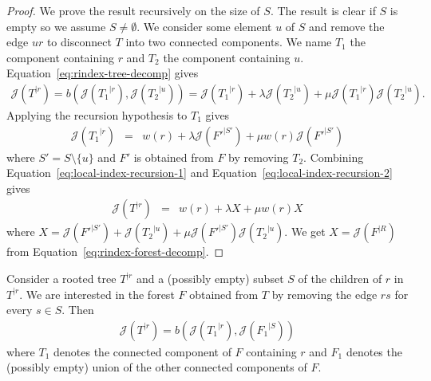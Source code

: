 \documentclass[11 pt]{modarticle}
\newcommand{\wmap}{w}
\newcommand{\rtree}[2]{{#1}^{\lvert #2}}
\newcommand{\bilinear}{b}
\newcommand{\rindexsymbol}{\mathcal{J}}
\newcommand{\rindex}[2]{\rindexsymbol(\rtree{#2}{#1})}
\begin{document}
\begin{proof}
We prove the result recursively on the size of $S$. The result is clear if $S$ is empty so we assume $S \neq \emptyset$. We consider some element $u$ of $S$ and remove the edge $ur$ to disconnect $T$ into two connected components. We name $T_1$ the component containing $r$ and $T_2$ the component containing $u$. Equation~\eqref{eq:rindex-tree-decomp} gives
\begin{eqnarray}
	\rindex{r}{T} = \bilinear(\rindex{r}{T_1}, \rindex{u}{T_2}) = \rindex{r}{T_1} + \lambda \rindex{u}{T_2} + \mu \rindex{r}{T_1} \rindex{u}{T_2}. \label{eq:local-index-recursion-1}
\end{eqnarray}
Applying the recursion hypothesis to $T_1$ gives
\begin{eqnarray}
	\rindex{r}{T_1} & = & \wmap(r) + \lambda \rindex{S'}{F'} + \mu \wmap(r) \rindex{S'}{F'} \label{eq:local-index-recursion-2}
\end{eqnarray}
where $S' = S \setminus \{u\}$ and $F'$ is obtained from $F$ by removing $T_2$.	Combining Equation~\eqref{eq:local-index-recursion-1} and Equation~\eqref{eq:local-index-recursion-2} gives
\begin{eqnarray*}
	\rindex{r}{T} & = & \wmap(r) + \lambda X + \mu \wmap(r) X
\end{eqnarray*}
where $X = \rindex{S'}{F'} + \rindex{u}{T_2} + \mu \rindex{S'}{F'} \rindex{u}{T_2}$. We get $X = \rindex{R}{F}$ from Equation~\eqref{eq:rindex-forest-decomp}.
\end{proof}

\begin{cor}\label{cor:local-index-recursion}
	Consider a rooted tree $\rtree{T}{r}$ and a (possibly empty) subset $S$ of the children of $r$ in $\rtree{T}{r}$. We are interested in the forest $F$ obtained from $T$ by removing the edge $rs$ for every $s \in S$. Then
\begin{eqnarray*}
	\rindex{r}{T} = \bilinear(\rindex{r}{T_1}, \rindex{S}{F_1})
\end{eqnarray*}
where $T_1$ denotes the connected component of $F$ containing $r$ and $F_1$ denotes the (possibly empty) union of the other connected components of $F$.
\end{cor}
\end{document}
